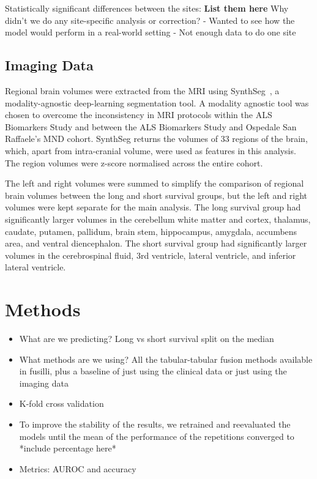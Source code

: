 Statistically significant differences between the sites: \textbf{List them here}
Why didn't we do any site-specific analysis or correction?
- Wanted to see how the model would perform in a real-world setting
- Not enough data to do one site

\subsection{Imaging Data}
Regional brain volumes were extracted from the MRI using SynthSeg~\cite{billotSynthSegDomainRandomisation2021}, a modality-agnostic deep-learning segmentation tool.
A modality agnostic tool was chosen to overcome the inconsistency in MRI protocols within the ALS Biomarkers Study and between the ALS Biomarkers Study and Ospedale San Raffaele's MND cohort.
SynthSeg returns the volumes of 33 regions of the brain, which, apart from intra-cranial volume, were used as features in this analysis.
The region volumes were z-score normalised across the entire cohort.

The left and right volumes were summed to simplify the comparison of regional brain volumes between the long and short survival groups, but the left and right volumes were kept separate for the main analysis.
The long survival group had significantly larger volumes in the cerebellum white matter and cortex, thalamus, caudate, putamen, pallidum, brain stem, hippocampus, amygdala, accumbens area, and ventral diencephalon.
The short survival group had significantly larger volumes in the cerebrospinal fluid, 3rd ventricle, lateral ventricle, and inferior lateral ventricle.


\section{Methods}
\begin{itemize}
    \item What are we predicting? Long vs short survival split on the median
    \item What methods are we using? All the tabular-tabular fusion methods available in fusilli, plus a baseline of just using the clinical data or just using the imaging data
    \item K-fold cross validation
    \item To improve the stability of the results, we retrained and reevaluated the models until the mean of the performance of the repetitions converged to *include percentage here*
    \item Metrics: AUROC and accuracy
\end{itemize}

